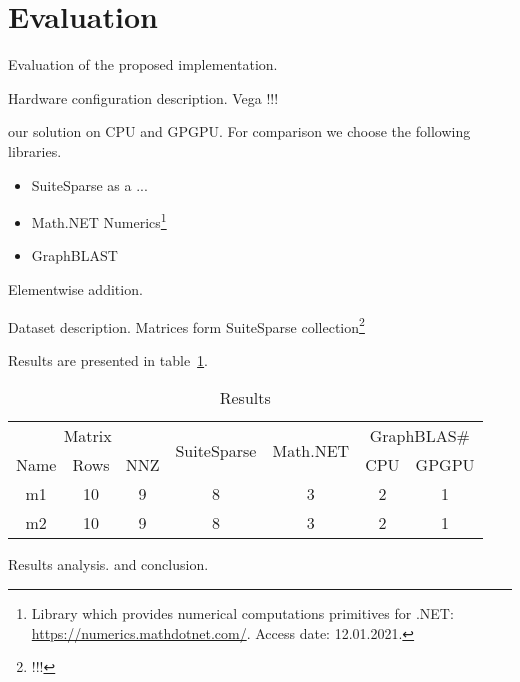 \section{Evaluation}

Evaluation of the proposed implementation.

Hardware configuration description. Vega !!!

our solution on CPU and GPGPU.
For comparison we choose the following libraries.
\begin{itemize}
\item SuiteSparse as a ...
\item Math.NET Numerics\footnote{Library which provides numerical computations primitives for .NET: \url{https://numerics.mathdotnet.com/}. Access date: 12.01.2021.}
\item GraphBLAST
\end{itemize}

Elementwise addition. 

Dataset description. Matrices form SuiteSparse collection\footnote{!!!}

Results are presented in table~\ref{tbl_results}.

\begin{table}
\caption{Results}
\label{tbl_results}
\begin{center}
\begin{tabular}{|c|c|c|c|c|c|c|}
\hline
\multicolumn{3}{|c|}{Matrix} & \multirow{2}{5em}{SuiteSparse} & \multirow{2}{4em}{Math.NET} & \multicolumn{2}{|c|}{GraphBLAS\#} \\
Name & Rows & NNZ            &                                &                             & CPU & GPGPU \\ 
\hline
\hline
m1     & 10          & 9        & 8     & 3& 2 & 1      \\ 
m2     & 10          & 9        & 8     & 3& 2 & 1      \\ 
\hline
\end{tabular}
\end{center}
\end{table}

Results analysis. and conclusion.


